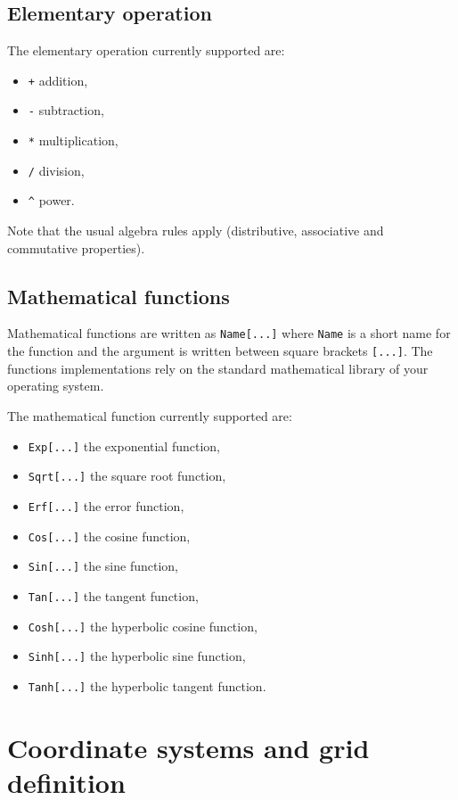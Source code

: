 \documentclass[12pt,a4paper]{report}
\begin{document}
\subsection{Elementary operation}
The elementary operation currently supported are:
\begin{itemize}
\item \texttt{+} addition,
\item \texttt{-} subtraction,
\item \texttt{*} multiplication,
\item \texttt{/} division,
\item \texttt{\^} power.
\end{itemize}
Note that the usual algebra rules apply (distributive, associative and commutative properties).

\subsection{Mathematical functions}
Mathematical functions are written as \texttt{Name[...]} where \texttt{Name} is a short name for the function and the argument is written between square brackets \texttt{[...]}.
The functions implementations rely on the standard mathematical library of your operating system.

The mathematical function currently supported are:
\begin{itemize}
\item \texttt{Exp[...]} the exponential function,
\item \texttt{Sqrt[...]} the square root function,
\item \texttt{Erf[...]} the error function,
\item \texttt{Cos[...]} the cosine function,
\item \texttt{Sin[...]} the sine function,
\item \texttt{Tan[...]} the tangent function,
\item \texttt{Cosh[...]} the hyperbolic cosine function,
\item \texttt{Sinh[...]} the hyperbolic sine function,
\item \texttt{Tanh[...]} the hyperbolic tangent function.
\end{itemize}

\section{Coordinate systems and grid definition}
\end{document}
